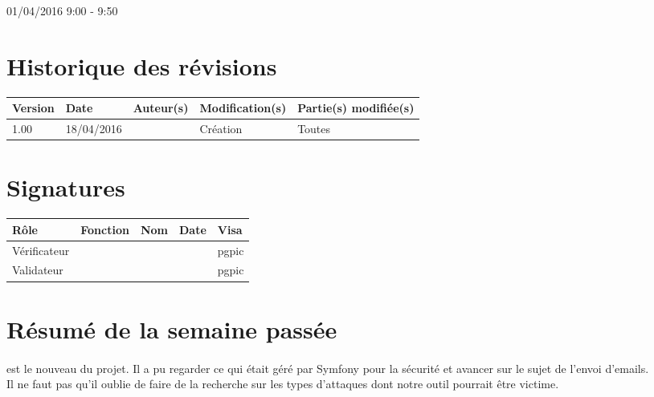 \documentclass [a4paper] {article}
\begin{document}
01/04/2016			 				%
\hfill   
\hfill 	 9:00 - 9:50 				%


\section*{Historique des révisions}
\begin{center}
			\begin{tabular}{| p{2.5cm} | p{3cm} | p{3cm} | p{3cm} | p{3.5cm} |}
				\hline
				\rowcolor{Gray}
				Version & Date & Auteur(s) & Modification(s) & Partie(s) modifiée(s)		 \\
				\hline
				1.00 & 18/04/2016 & \Pierre & Création & Toutes \\
		\hline		
			\end{tabular}
		\end{center}

\section*{Signatures}

		\begin{center}
			\begin{tabular}{| p{2.5cm} | p{4cm} | p{3cm} | p{3cm} | p{2.5cm} |}
				\hline
				\rowcolor{Gray}
				Rôle & Fonction & Nom & Date & Visa		 \\
				\hline
				Vérificateur & \RQA & \Kafui &  & pgpic \\[30pt]
				\hline
				Validateur & \CP & \Sergi &  & pgpic \\[30pt]	
				\hline
			\end{tabular}
		\end{center}


\section{Résumé de la semaine passée}
\paragraph*{}
\Florian{} est le nouveau \RS{} du projet. Il a pu regarder ce qui était géré par Symfony pour la sécurité et avancer sur le sujet de l'envoi d'emails. \\
Il ne faut pas qu'il oublie de faire de la recherche sur les types d'attaques dont notre outil pourrait être victime.
\end{document}

